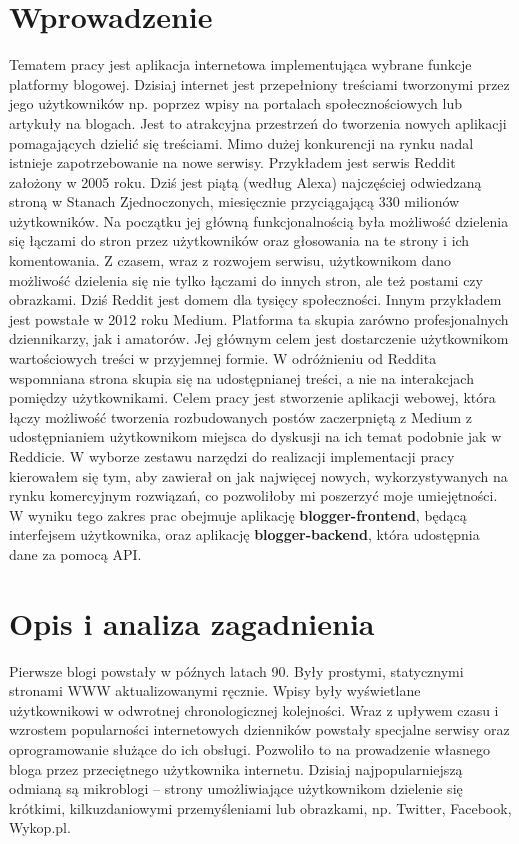 \documentclass[declaration,shortabstract]{iithesis}
\author         {Oskar Sobczyk}
\date          {}                     %
\begin{document}

\chapter{Wprowadzenie}
Tematem pracy jest aplikacja internetowa implementująca wybrane funkcje platformy blogowej. Dzisiaj internet jest przepełniony treściami tworzonymi przez jego użytkowników np. poprzez wpisy na portalach społecznościowych lub artykuły na blogach. Jest to atrakcyjna przestrzeń do tworzenia nowych aplikacji pomagających dzielić się treściami. Mimo dużej konkurencji na rynku nadal istnieje zapotrzebowanie na nowe serwisy. Przykładem jest serwis Reddit założony w 2005 roku. Dziś jest piątą (według Alexa) najczęściej odwiedzaną stroną w Stanach Zjednoczonych, miesięcznie przyciągającą 330 milionów użytkowników. Na początku jej główną funkcjonalnością była możliwość dzielenia się łączami do stron przez użytkowników oraz głosowania na te strony i ich komentowania. Z czasem, wraz z rozwojem serwisu, użytkownikom dano możliwość dzielenia się nie tylko łączami do innych stron, ale też postami czy obrazkami. Dziś Reddit jest domem dla tysięcy społeczności. Innym przykładem jest powstałe w 2012 roku Medium. Platforma ta skupia zarówno profesjonalnych dziennikarzy, jak i amatorów. Jej głównym celem jest dostarczenie użytkownikom wartościowych treści w przyjemnej formie. W odróżnieniu od Reddita wspomniana strona skupia się na udostępnianej treści, a nie na interakcjach pomiędzy użytkownikami.
Celem pracy jest stworzenie aplikacji webowej, która łączy możliwość tworzenia rozbudowanych postów zaczerpniętą z Medium z udostępnianiem użytkownikom miejsca do dyskusji na ich temat podobnie jak w Reddicie. W wyborze zestawu narzędzi do realizacji implementacji pracy kierowałem się tym, aby zawierał on jak najwięcej nowych, wykorzystywanych na rynku komercyjnym rozwiązań, co pozwoliłoby mi poszerzyć moje umiejętności. W wyniku tego zakres prac obejmuje aplikację \textbf{blogger-frontend}, będącą interfejsem użytkownika, oraz aplikację \textbf{blogger-backend}, która udostępnia dane za pomocą API.


\chapter{Opis i analiza zagadnienia}

Pierwsze blogi powstały w późnych latach 90. Były prostymi, statycznymi stronami WWW aktualizowanymi ręcznie. Wpisy były wyświetlane użytkownikowi w odwrotnej chronologicznej kolejności. Wraz z upływem czasu i wzrostem popularności internetowych dzienników powstały specjalne serwisy oraz oprogramowanie służące do ich obsługi. Pozwoliło to na prowadzenie własnego bloga przez przeciętnego użytkownika internetu. Dzisiaj najpopularniejszą odmianą są mikroblogi – strony umożliwiające użytkownikom dzielenie się krótkimi, kilkuzdaniowymi przemyśleniami lub obrazkami, np. Twitter, Facebook, Wykop.pl.
\end{document}

